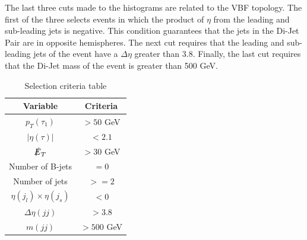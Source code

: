 The last three cuts made to the histograms are related to the VBF topology. The first of the three selects events in which the product of $\eta$ from the leading and sub-leading jets is negative. This condition guarantees that the jets in the Di-Jet Pair are in opposite hemispheres. The next cut requires that the leading and sub-leading jets of the event have a $\Delta \eta$ greater than 3.8. Finally, the last cut requires that the Di-Jet mass of the event is greater than 500 GeV.

\begin{table}
\centering
\begin{tabular}{|c|c|}
\hline
Variable & Criteria \\
\hline
$p_{T}(\tau_{1})$ & $> 50$ GeV \\
$|\eta(\tau)|$ & $< 2.1$ \\ 
$\slashed{E}_{T}$ & $> 30$ GeV \\
Number of B-jets & $= 0$ \\
Number of jets & $ >= 2$ \\
$\eta(j_{l}) \times \eta(j_{s})$ & $<0$ \\
$\Delta \eta(jj)$ & $ > 3.8$ \\
$m(jj)$ & $> 500$ GeV \\
\hline
\end{tabular}
\caption{Selection criteria table}
\label{table: cuts}
\end{table}
